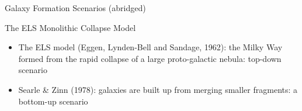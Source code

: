 \documentclass[letterpaper,landscape]{slides}
\begin{document}
\begin{slide}
\begin{center}
{\color{red}               Galaxy Formation Scenarios (abridged)}
\end{center}

{\color{blue} The ELS Monolithic Collapse Model}

\begin{itemize}
\item The ELS model (Eggen, Lynden-Bell and Sandage, 1962):
the Milky Way formed from the rapid collapse of a large proto-galactic 
nebula:  {\color{blue} top-down scenario}
\item Searle \& Zinn (1978): galaxies are built up from 
        merging smaller fragments: {\color{blue} a bottom-up scenario} 
\end{itemize}



\vfill
\end{slide}
\end{document}
